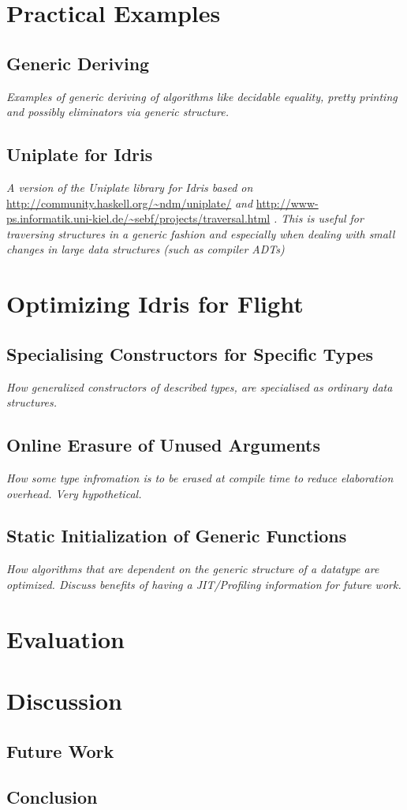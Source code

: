 \documentclass{ituthesis}
\begin{document}
\chapter{Practical Examples}
\label{cha:PracticalExamples}
\section{Generic Deriving}
\label{sec:GenericDeriving}
\textit{Examples of generic deriving of algorithms like decidable equality, pretty printing and possibly eliminators via generic structure.}
\section{Uniplate for Idris}
\label{sec:UniplateforIdris}
\textit{A version of the Uniplate library for Idris based on} \url{http://community.haskell.org/~ndm/uniplate/} \textit{and} \url{http://www-ps.informatik.uni-kiel.de/~sebf/projects/traversal.html} \textit{.
This is useful for traversing structures in a generic fashion and especially when dealing with small changes in large data structures (such as compiler ADTs)}
\chapter{Optimizing Idris for Flight}
\label{cha:OptimizingIdrisforFlight}
\section{Specialising Constructors for Specific Types}
\label{sec:SpecialisingConstructorsforSpecificTypes}
\textit{How generalized constructors of described types, are specialised as ordinary data structures.}
\section{Online Erasure of Unused Arguments}
\textit{How some type infromation is to be erased at compile time to reduce elaboration overhead. Very hypothetical.}
\label{sec:OnlineErasureofUnusedArguments}
\section{Static Initialization of Generic Functions}
\label{sec:StaticInitializationofGenericFunctions}
\textit{How algorithms that are dependent on the generic structure of a datatype are optimized. Discuss benefits of having a JIT/Profiling information for future work.}
\chapter{Evaluation}
\label{cha:Evaluation}
\chapter{Discussion}
\label{cha:Discussion}
\section{Future Work}
\label{sec:FutureWork}
\section{Conclusion}
\label{sec:Conclusion}
\end{document}
